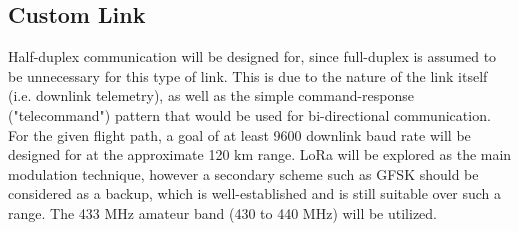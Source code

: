 \subsection{Custom Link}
Half-duplex communication will be designed for, since full-duplex is assumed to be unnecessary for this type of link. This is due to the nature of the link itself (i.e. downlink telemetry), as well as the simple command-response ("telecommand") pattern that would be used for bi-directional communication. For the given flight path, a goal of at least 9600 downlink baud rate will be designed for at the approximate 120 km range. LoRa will be explored as the main modulation technique, however a secondary scheme such as GFSK should be considered as a backup, which is well-established and is still suitable over such a range. The 433 MHz amateur band (430 to 440 MHz) will be utilized.